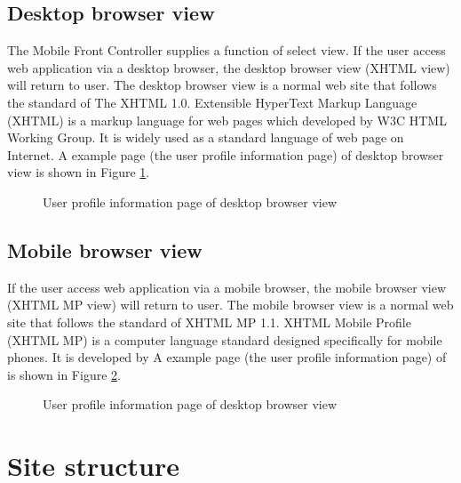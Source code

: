 \subsection{Desktop browser view}
\label{sec:WebApplication:DualView:DesktopBrowserView}

The Mobile Front Controller supplies a function of select view. If the user access web application via a desktop browser, the desktop browser view (XHTML view) will return to user. The desktop browser view is a normal web site that follows the standard of The XHTML 1.0. Extensible HyperText Markup Language (XHTML\label{sym:XHTML}) is a markup language for web pages which developed by W3C HTML Working Group. It is widely used as a standard language of web page on Internet. A example page (the user profile information page) of desktop browser view is shown in Figure \ref{fig:UserProfileInformationDesktopView}.

\begin{figure}[!hbtp]
\centering
{}
\caption{User profile information page of desktop browser view}
\label{fig:UserProfileInformationDesktopView}
\end{figure} 

\subsection{Mobile browser view}
\label{sec:WebApplication:DualView:MobileBrowserView}

If the user access web application via a mobile browser, the mobile browser view (XHTML MP view) will return to user. The mobile browser view is a normal web site that follows the standard of XHTML MP 1.1. XHTML Mobile Profile (XHTML MP) is a computer language standard designed specifically for mobile phones. It is developed by  A example page (the user profile information page) of is shown in Figure \ref{fig:UserProfileInformationMobileView}.

\begin{figure}[!hbtp]
\centering
{}
\caption{User profile information page of desktop browser view}
\label{fig:UserProfileInformationMobileView}
\end{figure} 

\section{Site structure}
\label{sec:WebApplication:SiteStructure}

